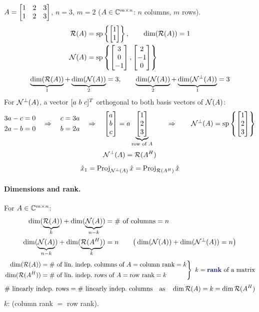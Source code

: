 \begin{example}
$A=\begin{bmatrix}1&2&3\\1&2&3\end{bmatrix}$, \qquad $n=3$, $m=2$ \quad ($A\in\mathbb{C}^{m\times n}$: $n$ columns, $m$ rows).
\begin{align*}
\mathcal{R}(A)&=\operatorname{sp}\left\{\begin{bmatrix}1\\1\end{bmatrix}\right\}, \qquad \dim(\mathcal{R}(A))=1\\
\mathcal{N}(A)&=\operatorname{sp}\left\{\begin{bmatrix}3\\0\\-1\end{bmatrix},\begin{bmatrix}2\\-1\\0\end{bmatrix}\right\}
\end{align*}
\[
\underbrace{\dim(\mathcal{R}(A))}_{1}+\underbrace{\dim(\mathcal{N}(A))}_{2}=3,
\qquad
\underbrace{\dim(\mathcal{N}(A))}_{2}+\underbrace{\dim(\mathcal{N}^\perp(A))}_{1}=3
\]
For $\mathcal{N}^\perp(A)$, a vector $[a\ b\ c]^{T}$ orthogonal to both basis vectors of $\mathcal{N}(A)$:
\[
\begin{aligned}3a-c&=0\\2a-b&=0\end{aligned}
\quad\Rightarrow\quad
\begin{aligned}c&=3a\\b&=2a\end{aligned}
\quad\Rightarrow\quad \begin{bmatrix}a\\b\\c\end{bmatrix}=a\underbrace{\begin{bmatrix}1\\2\\3\end{bmatrix}}_{\text{row of }A}
\qquad\Rightarrow\qquad
\mathcal{N}^\perp(A)=\operatorname{sp}\left\{\begin{bmatrix}1\\2\\3\end{bmatrix}\right\}
\]
\[
\mathcal{N}^\perp(A)=\mathcal{R}(A^{H})
\]
\[
\hat{x}_1=\operatorname{Proj}_{\mathcal{N}^\perp(A)}\hat{x}
=\operatorname{Proj}_{\mathcal{R}(A^{H})}\hat{x}
\]
\end{example}

\paragraph{Dimensions and rank.} For $A\in\mathbb{C}^{m\times n}$:
\begin{align*}
\dim(\underbrace{\mathcal{R}(A)}_{k})+\dim(\underbrace{\mathcal{N}(A)}_{n-k}) &= \#\text{ of columns}=n\\
\dim(\underbrace{\mathcal{N}(A)}_{n-k})+\dim(\underbrace{\mathcal{R}(A^{H})}_{k})&=n
\qquad \big(\dim(\mathcal{N}(A))+\dim(\mathcal{N}^\perp(A))=n\big)
\end{align*}
\[
\left.\begin{aligned}
\dim(\Range(A))&=\#\text{ of lin.\ indep.\ columns of }A=\text{column rank}=k\\
\dim(\Range(A\Hm))&=\#\text{ of lin.\ indep.\ rows of }A=\text{row rank}=k
\end{aligned}\right\}\ k=\text{\term{rank} of a matrix}
\]
\[
\#\text{ linearly indep.\ rows}=\#\text{ linearly indep.\ columns}
\quad\text{as}\quad \dim\mathcal{R}(A)=k=\dim\mathcal{R}(A^{H})
\]
$k$:  (column rank $=$ row rank).

